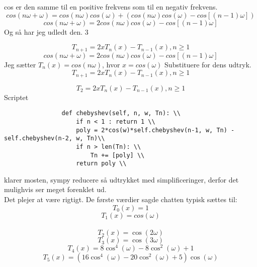 \begin{Opgaver}
\begin{kapitel}
\begin{Opgave}
\begin{UnderOpgave}[Using the trigonometric identity cos(A + B) = cos(A)cos(B) - sin(A)sin(B) show that]
                cos er den samme til en positive frekvens som til en negativ frekvens.
                \[cos(n\omega + \omega) = cos(n\omega)cos(\omega) + (cos(n\omega)cos(\omega) - cos[(n - 1)\omega])\]
                \[cos(n\omega + \omega) = 2cos(n\omega)cos(\omega) - cos[(n - 1)\omega]\]
                Og så har jeg udledt den. 3
            \end{UnderOpgave}
            \begin{UnderOpgave}
                \[T_{n + 1} = 2xT_n(x) - T_{n - 1}(x), n\geq 1\]
                \[cos(n\omega + \omega) = 2cos(n\omega)cos(\omega) - cos[(n - 1)\omega]\]
                Jeg sætter $T_n(x) = cos(n\omega)$, hvor $x = cos(\omega)$
                Substituere for dens udtryk. 
                \[T_{n + 1} = 2xT_n(x) - T_{n - 1}(x), n\geq 1\]
            \end{UnderOpgave}
            \begin{UnderOpgave}
                \[T_{2} = 2xT_n(x) - T_{n - 1}(x), n\geq 1\]
                Scriptet \\
                \begin{verbatim}
                def chebyshev(self, n, w, Tn): \\
                    if n < 1 : return 1 \\
                    poly = 2*cos(w)*self.chebyshev(n-1, w, Tn) - self.chebyshev(n-2, w, Tn)\\
                    if n > len(Tn): \\
                        Tn += [poly] \\
                    return poly \\
                \end{verbatim}
                klarer mosten, sympy reducere så udtrykket med simplificeringer, derfor det mulighvis ser meget forenklet ud.\\
                Det plejer at være rigtigt. 
                De første værdier sagde chatten typisk sættes til: 
                \[T_0(x) = 1\]
                \[T_1(x) = cos(\omega)\]\\
                \[T_{2}{\left(x \right)} = \cos{\left(2 \omega \right)}\]
                \[T_{3}{\left(x \right)} = \cos{\left(3 \omega \right)}\]
                \[T_{4}{\left(x \right)} = 8 \cos^{4}{\left(\omega \right)} - 8 \cos^{2}{\left(\omega \right)} + 1\]
                \[T_{5}{\left(x \right)} = \left(16 \cos^{4}{\left(\omega \right)} - 20 \cos^{2}{\left(\omega \right)} + 5\right) \cos{\left(\omega \right)}\]

\end{UnderOpgave}
\end{Opgave}
\end{kapitel}
\end{Opgaver}
